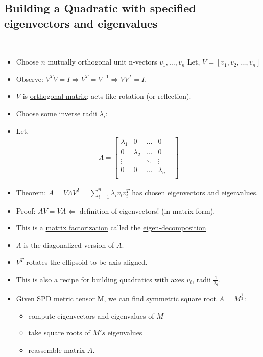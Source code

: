 \documentclass[10pt]{article}
\begin{document}
	\subsection*{Building a Quadratic with specified eigenvectors and eigenvalues}
		\
		\begin{itemize}
			\item Choose $n$ mutually orthogonal unit n-vectors $v_{1}, \dots, v_{n}$ Let, $V = [v_{1}, v_{2}, \dots, v_{n}]$
			\item Observe: $V^{T}V = I \Rightarrow V^{T} = V^{-1} \Rightarrow VV^{T} = I$.
			\item $V$ is \underline{orthogonal matrix}: acts like rotation (or reflection).
			\item Choose some inverse radii $\lambda_{i}$:
			\item Let,
				\begin{align*}
					\Lambda =
						\begin{bmatrix}
							\lambda_{1} & 0 & \dots & 0\\
							0 & \lambda_{2} & \dots & 0\\
							\vdots & & \ddots & \vdots &\\
							0 & 0 & \dots & \lambda_{n}\\
						\end{bmatrix}
				\end{align*}
			\item Theorem: $A = V\Lambda V^{T} = \sum_{i=1}^{n} \lambda_{i} v_{i}v_{i}^T$ has chosen eigenvectors and eigenvalues.
			\item Proof: $AV = V\Lambda \Leftarrow$ definition of eigenvectors! (in matrix form).
			\item This is a \underline{matrix factorization} called the \underline{eigen-decomposition}
			\item $\Lambda$ is the diagonalized version of $A$.
			\item $V^{T}$ rotates the ellipsoid to be axis-aligned.
			\item This is also a recipe for building quadratics with axes $v_{i}$, radii $\frac{1}{\lambda_{i}}$.
			\item Given SPD metric tensor M, we can find symmetric \underline{square root} $A = M^{\frac{1}{2}}$:
				\begin{itemize}
					\item compute eigenvectors and eigenvalues of $M$
					\item take square roots of $M's$ eigenvalues
					\item reassemble matrix $A$.
				\end{itemize}
		\end{itemize}
\end{document}
